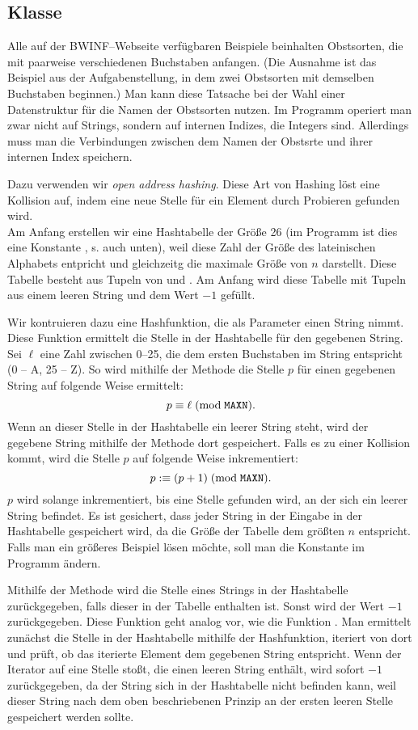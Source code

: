 \subsection{Klasse }
Alle auf der BWINF--Webseite verfügbaren Beispiele beinhalten Obstsorten, die mit paarweise verschiedenen 
Buchstaben anfangen.
(Die Ausnahme ist das Beispiel aus der Aufgabenstellung, in dem zwei Obstsorten mit demselben Buchstaben beginnen.)
Man kann diese Tatsache bei der Wahl einer Datenstruktur für die Namen der Obstsorten nutzen. 
Im Programm operiert man zwar nicht auf Strings, sondern auf internen Indizes, die Integers sind. 
Allerdings muss man die Verbindungen zwischen dem Namen der Obstsrte und ihrer internen Index speichern. 

Dazu verwenden wir \textit{open address hashing}.
Diese Art von Hashing löst eine Kollision auf, indem eine neue Stelle für ein Element durch Probieren 
gefunden wird.\\
Am Anfang erstellen wir eine Hashtabelle der Größe 26
(im Programm ist dies eine Konstante , s. auch  unten),
weil diese Zahl der Größe des lateinischen Alphabets entpricht und gleichzeitg
die maximale Größe von $n$ darstellt. 
Diese Tabelle besteht aus Tupeln von  und .
Am Anfang wird diese Tabelle mit Tupeln aus einem leeren String und dem Wert $-1$ gefüllt.

Wir kontruieren dazu eine Hashfunktion, die als Parameter einen String nimmt. 
Diese Funktion ermittelt die Stelle in der Hashtabelle für den gegebenen String.
Sei $\ell$ eine Zahl zwischen 0--25, die dem ersten Buchstaben im String
entspricht (0 -- A, 25 -- Z).
So wird mithilfe der Methode  die Stelle $p$ für einen gegebenen String 
auf folgende Weise ermittelt:
\[
p \equiv \ell\; (\textrm{mod}\; \texttt{MAXN}).
\]
Wenn an dieser Stelle in der Hashtabelle ein leerer String steht,
wird der gegebene String mithilfe der Methode  dort gespeichert.
Falls es zu einer Kollision kommt, wird die Stelle $p$ auf folgende Weise inkrementiert:
\[
p :\equiv (p + 1)\; (\textrm{mod}\; \texttt{MAXN}). 
\]
$p$ wird solange inkrementiert, bis eine Stelle gefunden wird, an der sich ein leerer String befindet.
Es ist gesichert, dass jeder String in der Eingabe in der Hashtabelle gespeichert wird, da
die Größe der Tabelle dem größten $n$ entspricht.
Falls man ein größeres Beispiel lösen möchte, soll man die Konstante  im Programm ändern.

Mithilfe der Methode  wird die Stelle eines Strings in der Hashtabelle zurückgegeben, 
falls dieser in der Tabelle enthalten ist. Sonst wird der Wert $-1$ zurückgegeben.
Diese Funktion geht analog vor, wie die Funktion .
Man ermittelt zunächst die Stelle in der Hashtabelle mithilfe der Hashfunktion,
iteriert von dort und prüft, ob das iterierte Element dem gegebenen String entspricht.
Wenn der Iterator auf eine Stelle stoßt, die einen leeren String enthält,
wird sofort $-1$ zurückgegeben, da der String sich in der Hashtabelle nicht befinden kann,
weil dieser String nach dem oben beschriebenen Prinzip an der ersten leeren Stelle 
gespeichert werden sollte.


